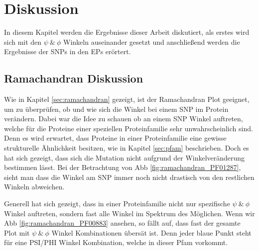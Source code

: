 \chapter{Diskussion}

In diesem Kapitel werden die Ergebnisse dieser Arbeit diskutiert, als erstes wird sich mit den $\psi\ \&\ \phi$ Winkeln auseinander gesetzt und anschließend werden die Ergebnisse der \ac{SNP}s in den \ac{EP}s erörtert.


\section{Ramachandran Diskussion}

Wie in Kapitel \ref{sec:ramachandran} gezeigt, ist der Ramachandran Plot geeignet, um zu überprüfen, ob und wie sich die Winkel bei einem \ac{SNP} im Protein verändern. Dabei war die Idee zu schauen ob an einem \ac{SNP} Winkel auftreten, welche für die Proteine einer speziellen Proteinfamilie sehr unwahrscheinlich sind. Denn es wird erwartet, dass Proteine in einer Proteinfamilie eine gewisse strukturelle Ähnlichkeit besitzen, wie in Kapitel \ref{sec:pfam} beschrieben. 
Doch es hat sich gezeigt, dass sich die Mutation nicht aufgrund der Winkelveränderung bestimmen lässt. Bei der Betrachtung von \ac{Abb} \ref{fig:ramachandran_PF01287}, sieht man dass die Winkel am \ac{SNP} immer noch nicht drastisch von den restlichen Winkeln abweichen.

Generell hat sich gezeigt, dass in einer Proteinfamilie nicht nur spezifische $\psi\ \&\ \phi$ Winkel auftreten, sondern fast alle Winkel im Spektrum des Möglichen. Wenn wir \ac{Abb} \ref{fig:ramachandran_PF00883} ansehen, so fällt auf, dass fast der gesamte Plot mit $\psi\ \&\ \phi$ Winkel Kombinationen übersät ist. Denn jeder blaue Punkt steht für eine PSI/PHI Winkel Kombination, welche in dieser \ac{Pfam} vorkommt.

